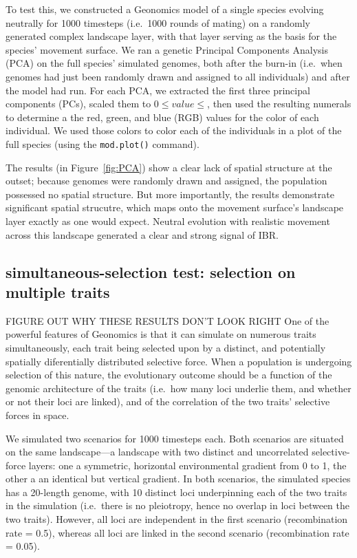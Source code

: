 ﻿\documentclass{article}
\begin{document}
To test this, we constructed a Geonomics model of a single species evolving neutrally
for 1000 timesteps (i.e.\ 1000 rounds of mating) on a randomly generated complex landscape layer,
with that layer serving as the basis for the species' movement surface.
We ran a genetic Principal Components Analysis (PCA) on the full species' simulated genomes,
both after the burn-in (i.e.\ when genomes had just been randomly drawn and assigned to all individuals)
and after the model had run. For each PCA, we extracted the first three principal components (PCs),
scaled them to $0\leq value\leq$, then used the resulting numerals to determine a the
red, green, and blue (RGB) values for the color of each individual.
We used those colors to color each of the individuals in a plot of the full species (using the \texttt{mod.plot()} command).

The results (in Figure~\ref{fig:PCA}) show a clear lack of spatial structure at the outset; because genomes were randomly drawn and assigned,
the population possessed no spatial structure. But more importantly, the results demonstrate significant
spatial strucutre, which maps onto the movement surface's landscape layer exactly as one would expect.
Neutral evolution with realistic movement across this landscape generated a clear and strong signal of IBR.

\subsection{simultaneous-selection test: selection on multiple traits}
{\large FIGURE OUT WHY THESE RESULTS DON'T LOOK RIGHT}
One of the powerful features of Geonomics is that it can simulate on numerous traits simultaneously,
each trait being selected upon by a distinct, and potentially spatially diferentially distributed selective force.
When a population is undergoing selection of this nature, the evolutionary outcome should be a function of the
genomic architecture of the traits (i.e.\ how many loci underlie them, and whether or not their loci are linked),
and of the correlation of the two traits' selective forces in space.

We simulated two scenarios for 1000 timesteps each. Both scenarios are situated on the same
landscape---a landscape with two distinct and uncorrelated selective-force layers: 
one a symmetric, horizontal environmental gradient from 0 to 1, the other a
an identical but vertical gradient.
In both scenarios, the simulated species has a 20-length genome, with 10 distinct loci underpinning
each of the two traits in the simulation (i.e.\ there is no pleiotropy, hence no overlap
in loci between the two traits). However, all loci are independent in the first scenario (recombination
rate = 0.5), whereas all loci are linked in the second scenario (recombination rate = 0.05).
\end{document}

